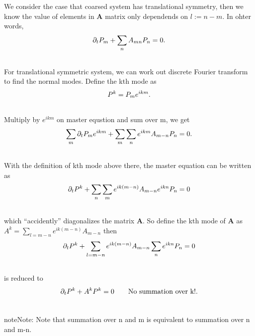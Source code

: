 \documentclass[letterpaper,10pt,english]{sphinxmanual}
\begin{document}
We consider the case that coarsed system has translational symmetry, then we know the value of elements in $\mathbf A$ matrix only dependends on $l:= n-m$. In ohter words,
\begin{gather}
\begin{split}\partial_t P_m  + \sum_n A_{mn} P_n  = 0.\end{split}\notag\\\begin{split}\end{split}\notag
\end{gather}
For translational symmetric system, we can work out discrete Fourier transform to find the normal modes. Define the kth mode as
\begin{gather}
\begin{split}P^k = P_m e^{ikm} .\end{split}\notag\\\begin{split}\end{split}\notag
\end{gather}
Multiply by $e^{ikm}$ on master equstion and sum over m, we get
\begin{gather}
\begin{split}\sum_m \partial_t P_m e^{ikm} + \sum_m \sum_n e^{ikm}A_{m-n} P_n = 0.\end{split}\notag\\\begin{split}\end{split}\notag
\end{gather}
With the definition of kth mode above there, the master equation can be written as
\begin{gather}
\begin{split}\partial_t P^k + \sum_n\sum_m e^{ik(m-n)}A_{m-n} e^{ikn}P_n = 0\end{split}\notag\\\begin{split}\end{split}\notag
\end{gather}
which ``accidently'' diagonalizes the matrix $\mathbf A$. So define the kth mode of $\mathbf A$ as $A^k = \sum_{l=m-n} e^{ik(m-n)}A_{m-n}$ then
\begin{gather}
\begin{split}\partial_t P^k + \sum_{l=m-n}e^{ik(m-n)}A_{m-n} \sum_n e^{ikn}P_n = 0\end{split}\notag\\\begin{split}\end{split}\notag
\end{gather}
is reduced to
\begin{gather}
\begin{split}\partial_t P^k + A^k P^k = 0 \qquad\text{No summation over k!.}\end{split}\notag\\\begin{split}\end{split}\notag
\end{gather}
\begin{notice}{note}{Note:}
Note that summation over n and m is equivalent to summation over n and m-n.
\end{notice}
\end{document}
